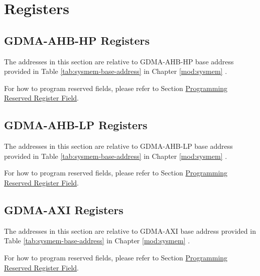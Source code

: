 \documentclass[main\_\_EN.tex]{subfiles}
\begin{document}


\newpage
\section{Registers}

\subsection{GDMA-AHB-HP Registers}

The addresses in this section are relative to GDMA-AHB-HP base address provided in Table \ref{tab:sysmem-base-address} in Chapter \ref{mod:sysmem} \textit{}.

For how to program reserved fields, please refer to Section \hyperref[programming-reserved-field]{Programming Reserved Register Field}.



\subsection{GDMA-AHB-LP Registers}

The addresses in this section are relative to GDMA-AHB-LP base address provided in Table \ref{tab:sysmem-base-address} in Chapter \ref{mod:sysmem} \textit{}.

For how to program reserved fields, please refer to Section \hyperref[programming-reserved-field]{Programming Reserved Register Field}.



\subsection{GDMA-AXI Registers}

The addresses in this section are relative to GDMA-AXI base address provided in Table \ref{tab:sysmem-base-address} in Chapter \ref{mod:sysmem} \textit{}.

For how to program reserved fields, please refer to Section \hyperref[programming-reserved-field]{Programming Reserved Register Field}.


\end{document}
